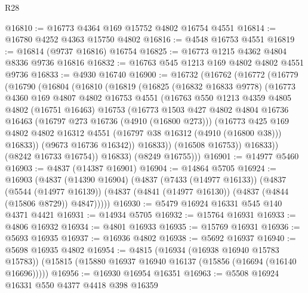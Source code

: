 \begin{lexlean}{R28}
\begin{coremodule}
@16810 := @16773 @4364 @169 @15752 @4802 @16754 @4551
@16814 := @16780 @4252 @4363 @15750 @4802
@16816 := @4548 @16753 @4551
@16819 := @16814 (@9737 @16816) @16754
@16825 := @16773 @1215 @4362 @4804 @8336 @9736 @16816
@16832 := @16763 @545 @1213 @169 @4802 @4802 @4551 @9736
@16833 := @4930 @16740
@16900 := @16732
    (@16762
      (@16772
        (@16779
          (@16790
            (@16804
              (@16810
                (@16819
                  (@16825
                    (@16832 @16833 @9778)
                    (@16773
                      @4360
                      @169
                      @4807
                      @4802
                      @16753
                      @4551
                      (@16763
                        @550
                        @1213
                        @4359
                        @4805
                        @4802
                        (@16751 @16463)
                        @16753
                        (@16773
                          @1503
                          @427
                          @4802
                          @4804
                          @16736
                          @16463
                          (@16797 @273 @16736 (@4910 (@16800 @273)))
                          (@16773
                            @425
                            @169
                            @4802
                            @4802
                            @16312
                            @4551
                            (@16797 @38 @16312 (@4910 (@16800 @38)))
                            @16833))
                        (@9673 @16736 @16342))
                      @16833))
                  (@16508 @16753))
                @16833))
            (@8242 @16733 @16754))
          @16833)
        (@8249 @16755)))
@16901 := @14977 @5460
@16903 := @4837 (@14387 @16901)
@16904 := @14864 @5705
@16924 := @16903
    (@4837
      (@14390 @16904)
      (@4837
        (@7433 (@14977 @16133))
        (@4837
          (@5544 (@14977 @16139))
          (@4837 (@4841 (@14977 @16130)) (@4837 (@4844 (@15806 @8729)) @4847)))))
@16930 := @5479 @16924 @16331 @545 @140 @4371 @4421
@16931 := @14934 @5705
@16932 := @15764 @16931
@16933 := @4806 @16932
@16934 := @4801 @16933
@16935 := @15769 @16931
@16936 := @5693 @16935
@16937 := @16936 @4802
@16938 := @5692 @16937
@16940 := @5698 @16935 @4802
@16954 := @4815
    (@16934 (@16938 @16940 @15783 @15783))
    (@15815 (@15880 @16937 @16940 @16137 (@15856 (@16694 (@16140 @16696)))))
@16956 := @16930 @16954 @16351
@16963 := @5508 @16924 @16331 @550 @4377 @4418 @398 @16359

\end{coremodule}
\end{lexlean}
